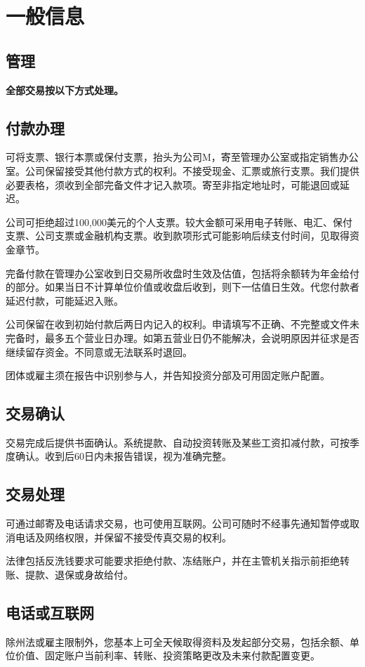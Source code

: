 \documentclass[UTF8,fontset=none,11pt,a4paper]{ctexart}
\begin{document}
\section*{一般信息}
\subsection*{管理}
\textbf{全部交易按以下方式处理。}


\subsection*{付款办理}
可将支票、银行本票或保付支票，抬头为公司M，寄至管理办公室或指定销售办公室。公司保留接受其他付款方式的权利。不接受现金、汇票或旅行支票。我们提供必要表格，须收到全部完备文件才记入款项。寄至非指定地址时，可能退回或延迟。


公司可拒绝超过100,000美元的个人支票。较大金额可采用电子转账、电汇、保付支票、公司支票或金融机构支票。收到款项形式可能影响后续支付时间，见取得资金章节。


完备付款在管理办公室收到日交易所收盘时生效及估值，包括将余额转为年金给付的部分。如果当日不计算单位价值或收盘后收到，则下一估值日生效。代您付款者延迟付款，可能延迟入账。


公司保留在收到初始付款后两日内记入的权利。申请填写不正确、不完整或文件未完备时，最多五个营业日办理。如第五营业日仍不能解决，会说明原因并征求是否继续留存资金。不同意或无法联系时退回。


团体或雇主须在报告中识别参与人，并告知投资分部及可用固定账户配置。


\subsection*{交易确认}
交易完成后提供书面确认。系统提款、自动投资转账及某些工资扣减付款，可按季度确认。收到后60日内未报告错误，视为准确完整。


\subsection*{交易处理}
可通过邮寄及电话请求交易，也可使用互联网。公司可随时不经事先通知暂停或取消电话及网络权限，并保留不接受传真交易的权利。


法律包括反洗钱要求可能要求拒绝付款、冻结账户，并在主管机关指示前拒绝转账、提款、退保或身故给付。


\subsection*{电话或互联网}
除州法或雇主限制外，您基本上可全天候取得资料及发起部分交易，包括余额、单位价值、固定账户当前利率、转账、投资策略更改及未来付款配置变更。
\end{document}
